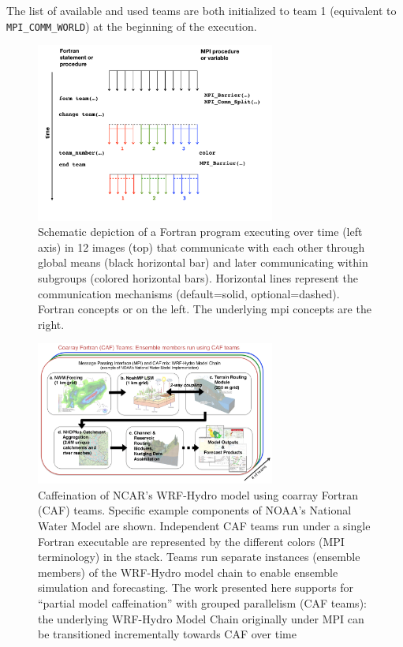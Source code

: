 The list of available and used teams are both initialized to team 1 (equivalent to \texttt{MPI\_COMM\_WORLD}) at the beginning of the execution.

\begin{figure}
\includegraphics[width=0.7\textwidth]{figures/teams}
\vspace{-36pt}
\caption{Schematic depiction of a Fortran program executing over time
  (left axis) in 12 images (top) that communicate with each other through global means (black horizontal bar) and later communicating within subgroups (colored horizontal bars).  Horizontal lines represent the communication mechanisms (default=solid, optional=dashed).  Fortran concepts or on the left.  The underlying \gls{mpi} concepts are the right.}
\end{figure}
%

\begin{figure}
\includegraphics[width=0.7\textwidth]{figures/WRF-Hydro-caf-ens-model_chain.png}
\vspace{-7pt}
\caption{Caffeination of NCAR's WRF-Hydro model using coarray Fortran (CAF)
  teams. Specific example components of  NOAA's National Water
  Model are shown. Independent CAF teams run under a single Fortran executable are represented by the different colors
  (MPI terminology) in the stack.  Teams run separate instances
  (ensemble members) of the WRF-Hydro model chain to enable ensemble
  simulation and forecasting. The work presented  here supports for ``partial model caffeination'' with grouped
  parallelism (CAF teams): the underlying WRF-Hydro Model Chain
  originally under MPI can be transitioned incrementally towards CAF
  over time\label{fig:caffeinate-wrf-hydro}}
\end{figure}
%
